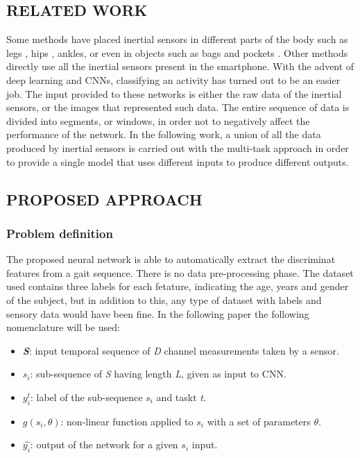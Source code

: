 \subsection{RELATED WORK}
Some methods have placed inertial sensors in different parts of the body 
such as legs \cite{0857651733}, hips \cite{0857651732}, ankles, or even in objects such as bags \cite{0857651735} and 
pockets \cite{0857651720}. Other methods \cite{0857651736} directly use all the inertial sensors present 
in the smartphone. With the advent of deep learning and CNNs, classifying 
an activity has turned out to be an easier job. The input provided to these 
networks is either the raw data of the inertial sensors, or the images that 
represented such data. The entire sequence of data is divided into segments, 
or windows, in order not to negatively affect the performance of the network. 
In the following work, a union of all the data produced by inertial sensors is 
carried out with the multi-task approach in order to provide a single model 
that uses different inputs to produce different outputs.

\subsection{PROPOSED APPROACH}
\subsubsection{Problem definition}
The proposed neural network is able to automatically extract the discriminat 
features from a gait sequence. There is no data pre-processing phase. The 
dataset used contains three labels for each fetature, indicating the age, years 
and gender of the subject, but in addition to this, any type of dataset with 
labels and sensory data would have been fine. In the following paper the 
following nomenclature will be used:
\begin{itemize}
    \item {\bfseries{\emph{S}}}: input temporal sequence of \emph{D} channel measurements taken by a sensor.
    \item {\bfseries{$ s_i $}}: sub-sequence of \emph{S} having length \emph{L}, given as input to CNN.
    \item $ y_i^t $: label of the sub-sequence $ s_i $ and taskt \emph{t}.
    \item $ g(s_i, \theta ) $: non-linear function applied to $ s_i $ with a set of parameters $ \theta $.
    \item {\bfseries{$ \hat{y_i} $}}: output of the network for a given $ s_i $ input.
\end{itemize}

